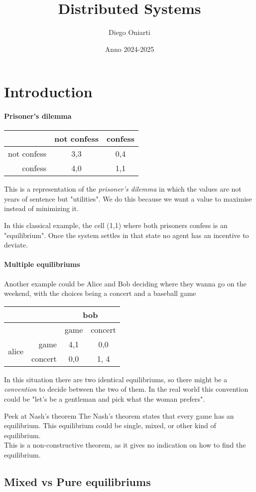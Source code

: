 \documentclass{article}
\title{Distributed Systems}
\author{Diego Oniarti}
\date{Anno 2024-2025}
\begin{document}
\maketitle
\tableofcontents

\newpage
\section{Introduction} 
\paragraph{Prisoner's dilemma}
\begin{center}
\begin{tabular}{r|c c}
    & not confess & confess \\
    \hline
    not confess & 3,3 & 0,4 \\
    confess & 4,0 & 1,1
\end{tabular}
\end{center}
This is a representation of the \textit{prisoner's dilemma} in which the values are not years of sentence but "utilities". We do this because we want a value to maximise instead of minimizing it.

In this classical example, the cell (1,1) where both prisoners confess is an "equilibrium". Once the system settles in that state no agent has an incentive to deviate.

\paragraph{Multiple equilibriums}
Another example could be Alice and Bob deciding where they wanna go on the weekend, with the choices being a concert and a baseball game
\begin{center}
    \begin{tabular}{r | r | c c}
        & & \multicolumn{2}{|c}{bob} \\
        \hline
        & & game & concert \\
        \hline
        \multirow{2}{2em}{alice} & game & 4,1 & 0,0 \\
                                 &  concert &  0,0 & 1, 4\\
    \end{tabular}
\end{center}
In this situation there are two identical equilibriums, so there might be a \textit{convention} to decide between the two of them. In the real world this convention could be "let's be a gentleman and pick what the woman prefers".

\begin{esempio}{Peek at Nash's theorem}
The Nash's theorem states that every game has an equilibrium. This equilibrium could be single, mixed, or other kind of equilibrium.\\
This is a non-constructive theorem, as it gives no indication on how to find the equilibrium.
\end{esempio}

\subsection{Mixed vs Pure equilibriums}
\end{document}
